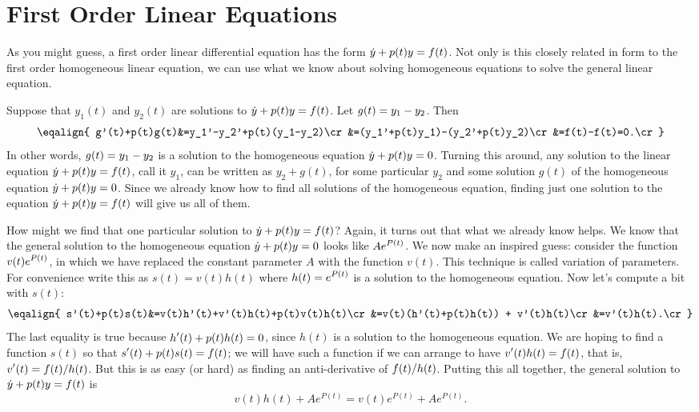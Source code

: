 \section{First Order Linear Equations}{}{}
\nobreak
As you might guess, a first order linear differential equation has the form 
$\displaystyle \dot y + p(t)y = f(t)$. Not only is this closely related in form
to the first order homogeneous linear equation, we can use what we
know about solving homogeneous equations to solve the general linear
equation. 

Suppose that $y_1(t)$ and $y_2(t)$ are solutions to 
$\displaystyle \dot y + p(t)y = f(t)$. Let $\displaystyle g(t)=y_1-y_2$. Then
$$\eqalign{
 g'(t)+p(t)g(t)&=y_1'-y_2'+p(t)(y_1-y_2)\cr
&=(y_1'+p(t)y_1)-(y_2'+p(t)y_2)\cr
&=f(t)-f(t)=0.\cr}
$$
In other words, $\displaystyle g(t)=y_1-y_2$ is a solution to the homogeneous
equation $\displaystyle \dot y + p(t)y = 0$. Turning this around, any solution
to the linear equation $\displaystyle \dot y + p(t)y = f(t)$, call it $y_1$, can
be written as $y_2+g(t)$, for some particular $y_2$ and some solution
$g(t)$ of the homogeneous equation $\displaystyle \dot y + p(t)y = 0$. Since we
already know how to find all solutions of the homogeneous equation,
finding just one solution to the equation $\displaystyle \dot y + p(t)y = f(t)$
will give us all of them.

How might we find that one particular solution to $\displaystyle \dot y + p(t)y
= f(t)$? Again, it turns out that what we already know helps. We know
that the general solution to the homogeneous equation
$\displaystyle \dot y + p(t)y = 0$ looks like $\displaystyle Ae^{P(t)}$. We now make an
inspired guess: consider the function $\displaystyle v(t)e^{P(t)}$, in which we
have replaced the constant parameter $A$ with the function
$v(t)$. This technique is called 
{\dfont variation of parameters}.
For
convenience write this as $s(t)=v(t)h(t)$ where $\displaystyle h(t)=e^{P(t)}$ 
is a solution to the
homogeneous equation. Now let's compute a bit with $s(t)$:
$$\eqalign{
s'(t)+p(t)s(t)&=v(t)h'(t)+v'(t)h(t)+p(t)v(t)h(t)\cr
&=v(t)(h'(t)+p(t)h(t)) + v'(t)h(t)\cr
&=v'(t)h(t).\cr}
$$
The last equality is true because $\displaystyle h'(t)+p(t)h(t)=0$, since $h(t)$
is a solution to the homogeneous equation. We are hoping to find a
function $s(t)$ so that $\displaystyle s'(t)+p(t)s(t)=f(t)$; we will have such a
function if we can arrange to have $\displaystyle v'(t)h(t)=f(t)$, that is,
$\displaystyle v'(t)=f(t)/h(t)$. But this is as easy (or hard) as finding an
anti-derivative of $\displaystyle f(t)/h(t)$. Putting this all together, the
general solution to $\displaystyle \dot y + p(t)y = f(t)$ is
$$v(t)h(t)+Ae^{P(t)} = v(t)e^{P(t)}+Ae^{P(t)}.$$

